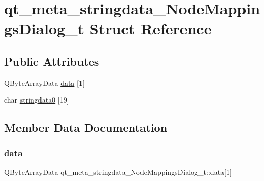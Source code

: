 \hypertarget{structqt__meta__stringdata___node_mappings_dialog__t}{}\section{qt\+\_\+meta\+\_\+stringdata\+\_\+\+Node\+Mappings\+Dialog\+\_\+t Struct Reference}
\label{structqt__meta__stringdata___node_mappings_dialog__t}
\subsection*{Public Attributes}
\begin{DoxyCompactItemize}
\item 
Q\+Byte\+Array\+Data \mbox{\hyperlink{structqt__meta__stringdata___node_mappings_dialog__t_a57324ece17fff08e1d7422f8da4f6754}{data}} \mbox{[}1\mbox{]}
\item 
char \mbox{\hyperlink{structqt__meta__stringdata___node_mappings_dialog__t_ab5a8dc57a3c11a3cfa24ae479a64392e}{stringdata0}} \mbox{[}19\mbox{]}
\end{DoxyCompactItemize}


\subsection{Member Data Documentation}
\mbox{\label{structqt__meta__stringdata___node_mappings_dialog__t_a57324ece17fff08e1d7422f8da4f6754}} 
\subsubsection{\texorpdfstring{data}{data}}
{\footnotesize\ttfamily Q\+Byte\+Array\+Data qt\+\_\+meta\+\_\+stringdata\+\_\+\+Node\+Mappings\+Dialog\+\_\+t\+::data\mbox{[}1\mbox{]}}

\mbox{\label{structqt__meta__stringdata___node_mappings_dialog__t_ab5a8dc57a3c11a3cfa24ae479a64392e}} 
